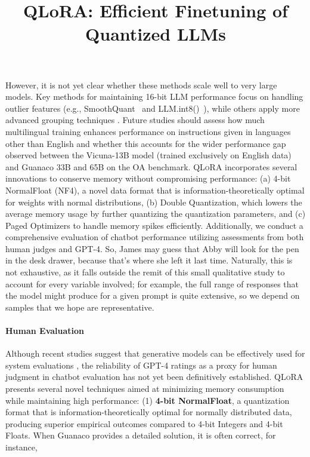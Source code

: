 \title{QLoRA: Efficient Finetuning of Quantized LLMs}
However, it is not yet clear whether these methods scale well to very large models. Key methods for maintaining 16-bit LLM performance focus on handling outlier features (e.g., SmoothQuant~\citep{xiao2022smoothquant} and LLM.int8()~\citep{dettmers2022llm}), while others apply more advanced grouping techniques \citep{park2022nuqmm, yao2022zeroquant}. Future studies should assess how much multilingual training enhances performance on instructions given in languages other than English and whether this accounts for the wider performance gap observed between the Vicuna-13B model (trained exclusively on English data) and {Guanaco} 33B and 65B on the OA benchmark. \textsc{QLoRA} incorporates several innovations to conserve memory without compromising performance: (a) 4-bit NormalFloat (NF4), a novel data format that is information-theoretically optimal for weights with normal distributions, (b) Double Quantization, which lowers the average memory usage by further quantizing the quantization parameters, and (c) Paged Optimizers to handle memory spikes efficiently. Additionally, we conduct a comprehensive evaluation of chatbot performance utilizing assessments from both human judges and GPT-4. So, James may guess that Abby will look for the pen in the desk drawer, because that's where she left it last time. Naturally, this is not exhaustive, as it falls outside the remit of this small qualitative study to account for every variable involved; for example, the full range of responses that the model might produce for a given prompt is quite extensive, so we depend on samples that we hope are representative. \paragraph{Human Evaluation} Although recent studies suggest that generative models can be effectively used for system evaluations \citep{fu2023gptscore}, the reliability of GPT-4 ratings as a proxy for human judgment in chatbot evaluation has not yet been definitively established. \textsc{QLoRA} presents several novel techniques aimed at minimizing memory consumption while maintaining high performance: (1) \textbf{4-bit NormalFloat}, a quantization format that is information-theoretically optimal for normally distributed data, producing superior empirical outcomes compared to 4-bit Integers and 4-bit Floats. When {Guanaco} provides a detailed solution, it is often correct, for instance,

